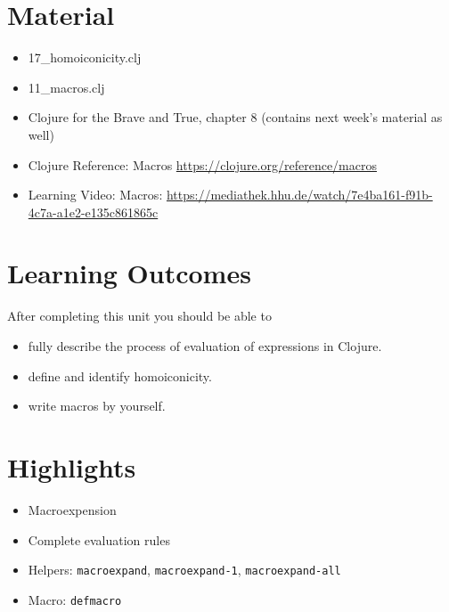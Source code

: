 \documentclass[11pt,a4paper]{article}
\begin{document}

\section{Material} 

\begin{itemize}
    \item 17\_homoiconicity.clj
    \item 11\_macros.clj
    \item Clojure for the Brave and True, chapter 8 (contains next week's material as well)
	\item Clojure Reference: Macros \url{https://clojure.org/reference/macros}
    \item Learning Video: Macros: \url{https://mediathek.hhu.de/watch/7e4ba161-f91b-4c7a-a1e2-e135c861865c}
\end{itemize}


\section{Learning Outcomes}

After completing this unit you should be able to

\begin{itemize}
	\item fully describe the process of evaluation of expressions in Clojure.
    \item define and identify homoiconicity.
    \item write macros by yourself.
\end{itemize}

\section{Highlights}

\begin{itemize}
    \item Macroexpension
    \item Complete evaluation rules
    \item Helpers: \verb|macroexpand|, \verb|macroexpand-1|, \verb|macroexpand-all|
    \item Macro: \verb|defmacro|
\end{itemize}
\end{document}
